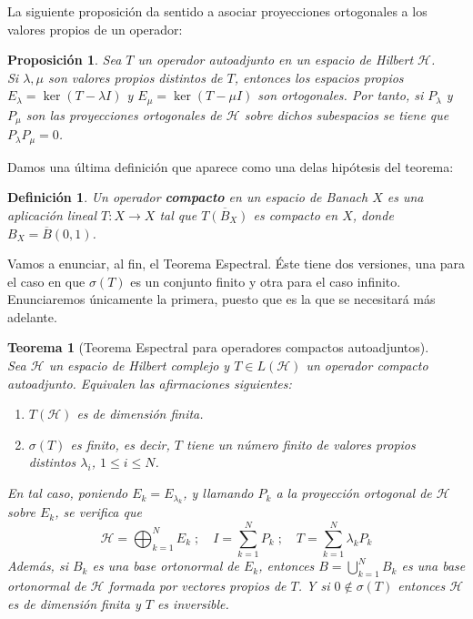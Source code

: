 \documentclass[11pt,a4paper,twoside,pdf]{article}
\numberwithin{equation}{section}
\newtheorem{theorem}{Teorema}
\newtheorem{definition}{Definición}
\newtheorem{proposition}{Proposición}
\begin{document}
	La siguiente proposición da sentido a asociar proyecciones ortogonales a los valores propios de un operador:
		\begin{proposition}
			Sea $T$ un operador autoadjunto en un espacio de Hilbert $\mathcal{H}$. \\
			Si $\lambda,\mu$ son valores propios distintos de $T$, entonces los espacios propios $E_\lambda=\ker(T-\lambda I)$ y $E_\mu=\ker(T-\mu I)$ son ortogonales. Por tanto, si $P_\lambda$ y $P_\mu$ son las proyecciones ortogonales de $\mathcal{H}$ sobre dichos subespacios se tiene que $P_\lambda P_\mu=0$.
		\end{proposition}
	
	Damos una última definición que aparece como una delas hipótesis del teorema:
		\begin{definition}
			Un operador \textbf{compacto} en un espacio de Banach $X$ es una aplicación lineal $T:X\rightarrow X$ tal que $\overline{T(B_X)}$ es compacto en $X$, donde $B_X=\overline{B}(0,1)$.
		\end{definition}
	
	Vamos a enunciar, al fin, el Teorema Espectral. Éste tiene dos versiones, una para el caso en que $\sigma(T)$ es un conjunto finito y otra para el caso infinito. Enunciaremos únicamente la primera, puesto que es la que se necesitará más adelante.
	
	\begin{theorem}[Teorema Espectral para operadores compactos autoadjuntos] \hspace{0.5cm}\\
	Sea $\mathcal{H}$ un espacio de Hilbert complejo y $T\in L(\mathcal{H})$ un operador compacto autoadjunto. Equivalen las afirmaciones siguientes:
		\begin{enumerate}[label=(\alph*),itemsep=0.5pt]
			\item $T(\mathcal{H})$ es de dimensión finita.
			\item $\sigma(T)$ es finito, es decir, $T$ tiene un número finito de valores propios distintos $\lambda_i$, $1\leq i\leq N$.
		\end{enumerate}
	En tal caso, poniendo $E_k=E_{\lambda_k}$, y llamando $P_k$ a la proyección ortogonal de $\mathcal{H}$ sobre $E_k$, se verifica que 
	 	\begin{equation}
	 		\mathcal{H}=\displaystyle\bigoplus_{k=1}^N E_k \; ; \quad
	 		I = \displaystyle\sum_{k=1}^{N} P_k \; ; \quad
	 		T = \displaystyle\sum_{k=1}^{N} \lambda_k P_k 
	 	\end{equation}
	 Además, si $B_k$ es una base ortonormal de $E_k$, entonces $B=\bigcup_{k=1}^N B_k$	es una base ortonormal de $\mathcal{H}$ formada por vectores propios de $T$. Y si $0\notin \sigma(T)$ entonces $\mathcal{H}$ es de dimensión finita y $T$ es inversible.
	\end{theorem}
\end{document}
